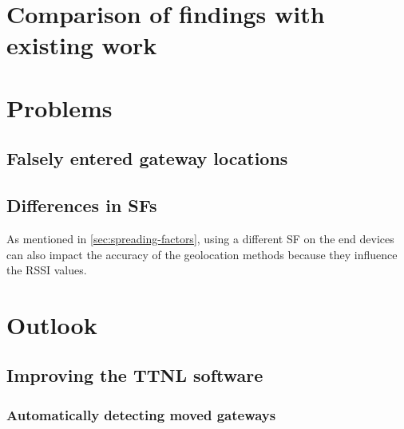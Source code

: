 

\section{Comparison of findings with existing work}


\section{Problems}

\subsection{Falsely entered gateway locations}


\subsection{Differences in \acfp{SF}}

As mentioned in \cref{sec:spreading-factors}, using a different \ac{SF} on the end devices can also impact the accuracy of the geolocation methods because they influence the \ac{RSSI} values.

\section{Outlook}


\subsection{Improving the \acf{TTNL} software}


\subsubsection{Automatically detecting moved gateways}

